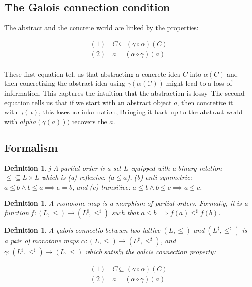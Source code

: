 \documentclass[11pt]{book}
\newtheorem{definition}[theorem]{Definition}
\begin{document}
\subsection{The Galois connection condition}

The abstract and the concrete world are linked by the properties:

\begin{align*}
    &(1) \quad C \subseteq (\gamma\circ \alpha)(C) \\
    &(2) \quad a = (\alpha \circ \gamma)(a) \\
\end{align*}

These first equation tell us that abstracting a concrete idea $C$ into
$\alpha(C)$ and then concretizing the abstract idea using $\gamma(\alpha(C))$
might lead to a loss of information. This captures the intuition that the abstraction
is lossy. The second equation tells us that if we start with an abstract object
$a$, then concretize it with $\gamma(a)$, this loses no information; Bringing
it back up to the abstract world with $alpha(\gamma(a)))$ recovers the $a$.

\subsection{Formalism}

\begin{definition}j
A partial order is a set $L$ equipped with a binary relation $\leq \subseteq L
\times L$ which is (a) reflexive: ($a \leq a$), (b) anti-symmetric: $a \leq b
\land b \leq a \implies a = b$, and (c) transitive: $a \leq b \land b \leq c
\implies a \leq c$.
\end{definition}

\begin{definition}
    A monotone map is a morphism of partial orders. Formally,
it is a function $f: (L, \leq) \rightarrow (L^\sharp, \leq^\sharp)$ such that
$a \leq b \implies f(a) \leq^\sharp f(b)$.
\end{definition}

\begin{definition}
A galois connectio between two
lattice $(L, \leq)$ and $(L^\sharp, \leq^\sharp)$ is a pair of monotone maps
$\alpha: (L, \leq) \rightarrow (L^\sharp, \leq^\sharp)$, and
$\gamma: (L^\sharp, \leq^\sharp) \rightarrow  (L, \leq)$ which satisfy the
galois connection property:

\begin{align*}
    &(1) \quad C \subseteq (\gamma\circ \alpha)(C) \\
    &(2) \quad a = (\alpha \circ \gamma)(a) \\
\end{align*}
\end{definition}
\end{document}
